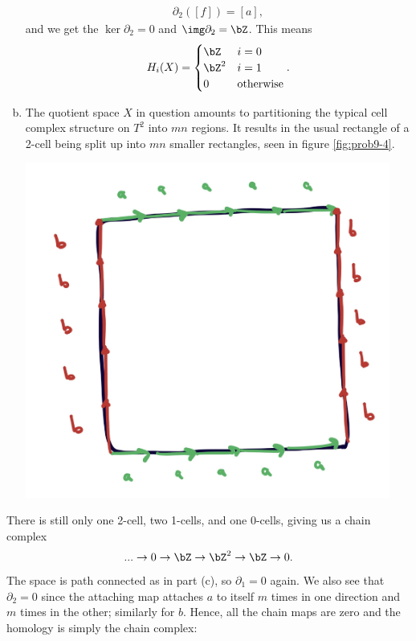 \begin{homework}[e]
\begin{prf}
\begin{enumerate}[(a)]
      \begin{align*}
        \partial_2([f]) = [a],
      \end{align*}
      and we get the $\ker \partial_2 = 0$ and $\img\partial_2 = \bZ$. This means
      \begin{align*}
        H_i(X) =
        \begin{cases}
          \bZ & i = 0\\
          \bZ^2 & i = 1 \\
          0 & \text{otherwise}
        \end{cases}.
      \end{align*}
    \item The quotient space $X$ in question amounts to partitioning the typical cell complex structure on $T^2$ into $mn$ regions. It results in the usual rectangle of a 2-cell being split up into $mn$ smaller rectangles, seen in figure \ref{fig:prob9-4}.
      \begin{center}
        \includegraphics[width=12cm]{figures/hwk12-fig4.png}
        \label{fig:prob9-4}
      \end{center}
    \end{enumerate}
    There is still only one 2-cell, two 1-cells, and one 0-cells, giving us a chain complex
    \begin{align*}
      ...\to 0\to \bZ \to \bZ^2 \to \bZ \to 0.
    \end{align*}
    The space is path connected as in part (c), so $\partial_1 = 0$ again. We also see that $\partial_2 = 0$ since the attaching map attaches $a$ to itself $m$ times in one direction and $m$ times in the other; similarly for $b$. Hence, all the chain maps are zero and the homology is simply the chain complex:

\end{prf}
\end{homework}
